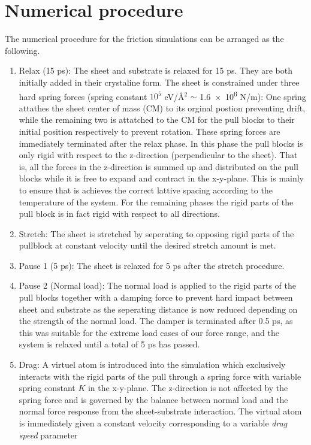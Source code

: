 \section{Numerical procedure}

The numerical procedure for the friction simulations can be arranged as the following.

\begin{enumerate}
  \item Relax (15 ps): The sheet and substrate is relaxed for 15 ps. They are
  both initially added in their crystaline form. The sheet is constrained under
  three hard spring forces (spring constant $10^5$ eV/Å$^2$ $\sim$ \num{1.6e6} N/m): One spring
  attathes the sheet center of mass (CM) to its orginal postion preventing
  drift, while the remaining two is attatched to the CM for the pull blocks to
  their initial position respectively to prevent rotation. These spring forces
  are immediately terminated after the relax phase. In this phase the pull
  blocks is only rigid with respect to the z-direction (perpendicular to the
  sheet). That is, all the forces in the z-direction is summed up and
  distributed on the pull blocks while it is free to expand and contract in the
  x-y-plane. This is mainly to ensure that is achieves the correct lattive
  spacing according to the temperature of the system. For the remaining phases
  the rigid parts of the pull block is in fact rigid with respect to all
  directions. 
  \item Stretch: The sheet is stretched by seperating to opposing rigid parts of
  the pullblock at constant velocity until the desired stretch amount is met. 
  \item Pause 1 (5 ps): The sheet is relaxed for 5 ps after the stretch
  procedure.
  \item Pause 2 (Normal load): The normal load is applied to the rigid parts of
  the pull blocks together with a damping force to prevent hard impact between
  sheet and substrate as the seperating distance is now reduced depending on the
  strength of the normal load. The damper is terminated after 0.5 ps, as this
  was suitable for the extreme load cases of our force range, and the system is
  relaxed until a total of 5 ps has passed.
  \item Drag: A virtuel atom is introduced into the simulation which exclusively
  interacts with the rigid parts of the pull through a spring force with variable spring constant $K$ in the x-y-plane. The z-direction is not affected by the spring force and is governed by the balance between normal load and the normal force response from the sheet-substrate interaction. The virtual atom is immediately given a constant velocity corresponding to a variable \textit{drag speed} parameter
\end{enumerate}

